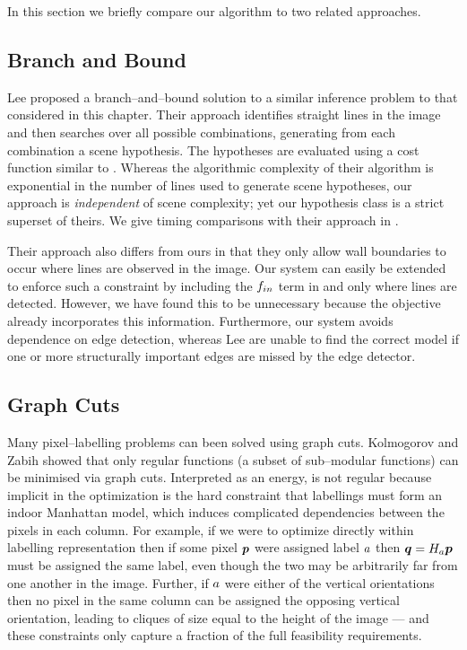 In this section we briefly compare our algorithm to two related
approaches.

\subsection{Branch and Bound}
Lee \etal \cite{Lee09} proposed a branch--and--bound solution to a
similar inference problem to that considered in this chapter. Their
approach identifies straight lines in the image and then searches over
all possible combinations, generating from each combination a scene
hypothesis. The hypotheses are evaluated using a cost function similar
to . Whereas the algorithmic complexity of their
algorithm is exponential in the number of lines used to generate scene
hypotheses, our approach is \textit{independent} of scene complexity;
yet our hypothesis class is a strict superset of theirs. We give
timing comparisons with their approach in .

Their approach also differs from ours in that they only allow wall
boundaries to occur where lines are observed in the image. Our system
can easily be extended to enforce such a constraint by including the
$\SubProbIN$ term in  and
 only where lines are detected. However, we
have found this to be unnecessary because the objective
 already incorporates this
information. Furthermore, our system avoids dependence on edge
detection, whereas Lee \etal are unable to find the correct model if
one or more structurally important edges are missed by the edge
detector.

\subsection{Graph Cuts}
Many pixel--labelling problems can been solved using graph
cuts. Kolmogorov and Zabih \cite{Kolmogorov02} showed that only
regular functions (a subset of sub--modular functions) can be
minimised via graph cuts. Interpreted as an energy,
 is not regular because implicit in the
optimization is the hard constraint that labellings must form an
indoor Manhattan model, which induces complicated dependencies between
the pixels in each column. For example, if we were to optimize
directly within labelling representation then if some pixel $\Pixel$
were assigned label $\Orient$ then $\OtherPixel=\Hcf\Pixel$ must be
assigned the same label, even though the two may be arbitrarily far
from one another in the image. Further, if $\Orient$ were either of
the vertical orientations then no pixel in the same column can be
assigned the opposing vertical orientation, leading to cliques of size
equal to the height of the image --- and these constraints only
capture a fraction of the full feasibility requirements.

